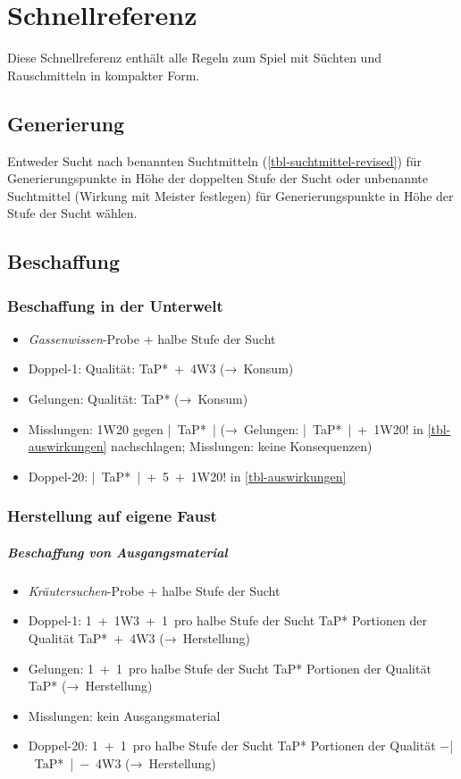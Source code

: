 \chapter{Schnellreferenz\label{quick-ref}}
Diese Schnellreferenz enthält alle Regeln zum Spiel mit Süchten und Rauschmitteln in kompakter Form.

\begin{multicols}{2}
\section*{Generierung}
Entweder Sucht nach benannten Suchtmitteln (\vref{tbl-suchtmittel-revised}) für Generierungspunkte in Höhe der doppelten Stufe der Sucht oder unbenannte Suchtmittel (Wirkung mit Meister festlegen) für Generierungspunkte in Höhe der Stufe der Sucht wählen.

\section*{Beschaffung}
\subsection*{Beschaffung in der Unterwelt}
\begin{itemize}[nosep]
	\item \emph{Gassenwissen}-Probe + halbe Stufe der Sucht
	\item Doppel-1: Qualität: TaP*~+~4W3 (→~Konsum)
	\item Gelungen: Qualität: TaP* (→~Konsum)
	\item Misslungen: 1W20 gegen |~TaP*~| (→~Gelungen: |~TaP*~|~+~1W20! in \vref{tbl-auswirkungen} nachschlagen; Misslungen: keine Konsequenzen)
	\item Doppel-20: |~TaP*~|~+~5~+~1W20! in \vref{tbl-auswirkungen}
\end{itemize}
\subsection*{Herstellung auf eigene Faust}
\paragraph*{Beschaffung von Ausgangsmaterial}
\begin{itemize}[nosep]
	\item \emph{Kräutersuchen}-Probe + halbe Stufe der Sucht
	\item Doppel-1: 1~+~1W3~+~1~pro halbe Stufe der Sucht TaP* Portionen der Qualität TaP*~+~4W3 (→~Herstellung)
	\item Gelungen: 1~+~1~pro halbe Stufe der Sucht TaP* Portionen der Qualität TaP* (→~Herstellung)
	\item Misslungen: kein Ausgangsmaterial
	\item Doppel-20: 1~+~1~pro halbe Stufe der Sucht TaP* Portionen der Qualität −|~TaP*~|~−~4W3 (→~Herstellung)
\end{itemize}

\end{multicols}
